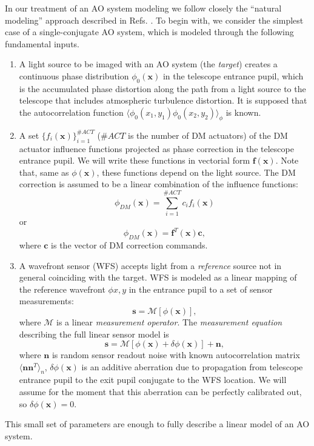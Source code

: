In our treatment of an AO system modeling we follow closely the ``natural
modeling'' approach described in Refs.
\cite{WibergMaxGavel1,WibergMaxGavel2}. To begin with, we consider the simplest
case of a single-conjugate AO system, which is modeled through the following
fundamental inputs.
\begin{enumerate}
	\item A light source to be imaged with an AO system (the \emph{target})
	creates a continuous phase distribution $\phi_{0}(\bm{x})$ in the
  telescope entrance pupil,
	which is the accumulated phase distortion along the
  path from a light source to the telescope that includes atmospheric
  turbulence distortion. It is supposed that the
  autocorrelation function $\langle \phi_{0}(x_{1},y_{1}) \phi_{0}(x_{2},y_{2})
  \rangle_{\phi}$ is known.
  \item A set $\{ f_{i}(\bm{x}) \}_{i=1}^{\#ACT}$ ($\#ACT$ is the number of DM
  actuators) of the DM actuator influence
  functions projected as phase correction in the telescope entrance pupil. We
  will write these functions in vectorial form $\bm{f}(\bm{x})$. Note that, same
  as $\phi(\bm{x})$, these functions depend on the light source. The DM
  correction is assumed to be a linear combination of the influence functions:
  \begin{equation} \label{eq:dm-phase-correction}
		\phi_{DM}(\bm{x}) = \sum_{i=1}^{\#ACT} c_{i} f_{i}(\bm{x})
	\end{equation}
	or
	$$
	  \phi_{DM}(\bm{x}) = \bm{f}^{T}(\bm{x}) \bm{c},
	$$
	where $\bm{c}$ is the vector of DM correction commands.
  \item A wavefront sensor (WFS) accepts light from a \emph{reference} source
  not in general coinciding with the target. WFS is modeled as a linear
  mapping of the reference wavefront $\phi{x,y}$ in the entrance pupil to a
  set of sensor measurements:
  \begin{equation} \label{eq:wfs-measurement-operator}
    \bm{s} = \mathcal{M} [ \phi(\bm{x}) ],
  \end{equation}
  where $\mathcal{M}$ is a linear \emph{measurement operator}.
   The \emph{measurement equation}
   describing the full linear sensor model is
  \begin{equation} \label{eq:measurement-equation}
	  \bm{s} = \mathcal{M} [ \phi(\bm{x}) + \delta \phi(\bm{x}) ] + \bm{n},
  \end{equation}
  where $\bm{n}$ is random sensor readout noise with known autocorrelation
  matrix $\langle \bm{n} \bm{n}^{T} \rangle_{n}$,
  $\delta \phi(\bm{x})$ is an additive aberration due to propagation from
  telescope entrance pupil to the exit pupil conjugate to the WFS location. We
  will assume for the moment that this aberration can be perfectly calibrated
  out, so $\delta \phi (\bm{x}) = 0$.
\end{enumerate}
This small set of parameters are enough to fully describe a linear model of an
AO system.

